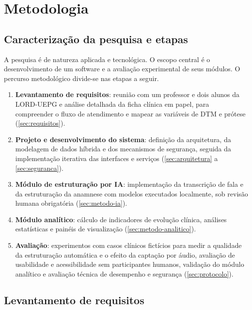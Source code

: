 \chapter{Metodologia}
\label{cap:metodologia}

\section{Caracterização da pesquisa e etapas}

A pesquisa é de natureza aplicada e tecnológica. O escopo central é o desenvolvimento de um software e a avaliação experimental de seus módulos. O percurso metodológico divide-se nas etapas a seguir.

\begin{enumerate}
	\item \textbf{Levantamento de requisitos}: reunião com um professor e dois alunos da LORD-UEPG e análise detalhada da ficha clínica em papel, para compreender o fluxo de atendimento e mapear as variáveis de DTM e prótese (\autoref{sec:requisitos}).
	\item \textbf{Projeto e desenvolvimento do sistema}: definição da arquitetura, da modelagem de dados híbrida e dos mecanismos de segurança, seguida da implementação iterativa das interfaces e serviços (\autoref{sec:arquitetura} a \autoref{sec:seguranca}).
	\item \textbf{Módulo de estruturação por IA}: implementação da transcrição de fala e da estruturação da anamnese com modelos executados localmente, sob revisão humana obrigatória (\autoref{sec:metodo-ia}).
	\item \textbf{Módulo analítico}: cálculo de indicadores de evolução clínica, análises estatísticas e painéis de visualização (\autoref{sec:metodo-analitico}).
	\item \textbf{Avaliação}: experimentos com casos clínicos fictícios para medir a qualidade da estruturação automática e o efeito da captação por áudio, avaliação de usabilidade e acessibilidade sem participantes humanos, validação do módulo analítico e avaliação técnica de desempenho e segurança (\autoref{sec:protocolo}).
\end{enumerate}

\section{Levantamento de requisitos}
\label{sec:requisitos}

